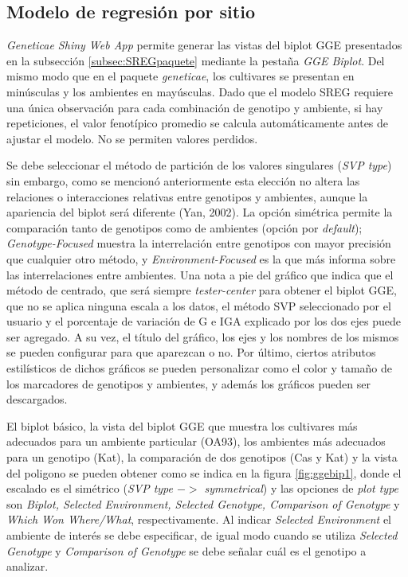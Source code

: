 \subsection{Modelo de regresión por sitio}

\emph{Geneticae Shiny Web App} permite generar las vistas del biplot GGE presentados en la subsección \ref{subsec:SREGpaquete} mediante la pestaña \emph{GGE Biplot}. Del mismo modo que en el paquete \emph{geneticae}, los cultivares se presentan en minúsculas y los ambientes en mayúsculas. Dado que el modelo SREG requiere una única observación para cada combinación de genotipo y ambiente, si hay repeticiones, el valor fenotípico promedio se calcula automáticamente antes de ajustar el modelo. No se permiten valores perdidos. 

Se debe seleccionar el método de partición de los valores singulares (\emph{SVP type}) sin embargo, como se mencionó anteriormente esta elección no altera las relaciones o interacciones relativas entre genotipos y ambientes, aunque la apariencia del biplot será diferente (Yan, 2002). La opción simétrica permite la comparación tanto de genotipos como de ambientes (opción por \emph{default}); \emph{Genotype-Focused} muestra la interrelación entre genotipos con mayor precisión que cualquier otro método, y \emph{Environment-Focused} es la que más informa sobre las interrelaciones entre ambientes. Una nota a pie del gráfico que indica que el método de centrado, que será siempre \emph{tester-center} para obtener el biplot GGE, que no se aplica ninguna escala a los datos, el método SVP seleccionado por el usuario y el porcentaje de variación de G e IGA explicado por los dos ejes puede ser agregado. A su vez, el título del gráfico, los ejes y los nombres de los mismos se pueden configurar para que aparezcan o no. Por último, ciertos atributos estilísticos de dichos gráficos se pueden personalizar como el color y tamaño de los marcadores de genotipos y ambientes, y además los gráficos pueden ser descargados.  

El biplot básico, la vista del biplot GGE que muestra los cultivares más adecuados para un ambiente particular (OA93), los ambientes más adecuados para un genotipo (Kat), la comparación de dos genotipos (Cas y Kat) y la vista del poligono se pueden obtener como se indica en la figura \ref{fig:ggebip1}, donde el escalado es el simétrico (\emph{SVP type $->$ symmetrical}) y las opciones de \emph{plot type} son \emph{Biplot,
Selected Environment, Selected Genotype, Comparison of Genotype} y \emph{Which Won Where/What}, respectivamente. Al indicar \emph{Selected Environment} el ambiente de interés se debe especificar, de igual modo cuando se utiliza \emph{Selected Genotype} y 
\emph{Comparison of Genotype} se debe señalar cuál es el genotipo a analizar.

